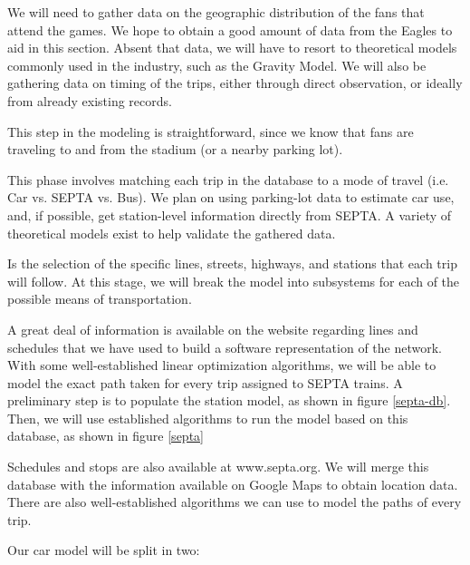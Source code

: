 \begin{description}[style=nextline]
    \item[Trip Generation] We will need to gather data on the
  geographic distribution of the fans that attend the games. We hope
  to obtain a good amount of data from the Eagles to aid in this
  section. Absent that data, we will have to resort to theoretical
  models commonly used in the industry, such as the Gravity Model. We
  will also be gathering data on timing of the trips, either through
  direct observation, or ideally from already existing records.
    \item[Trip Distribution] This step in the modeling is
  straightforward, since we know that fans are traveling to and from
  the stadium (or a nearby parking lot).
    \item[Mode Choice] This phase involves matching each trip in the
  database to a mode of travel (i.e. Car vs. SEPTA vs. Bus). We plan
  on using parking-lot data to estimate car use, and, if possible, get
  station-level information directly from SEPTA. A variety of
  theoretical models exist to help validate the gathered data.
    \item[Trip Assignment] Is the selection of the specific lines,
  streets, highways, and stations that each trip will follow. At this
  stage, we will break the model into subsystems for each of the
  possible means of transportation.
    \begin{description}[style=nextline]
        \item[Trains] A great deal of information is available on the
      website regarding lines and schedules that we have used to build
      a software representation of the network. With some
      well-established linear optimization algorithms, we will be able
      to model the exact path taken for every trip assigned to SEPTA
      trains. A preliminary step is to populate the station model, as
      shown in figure \ref{septa-db}. Then, we will use established
      algorithms to run the model based on this database, as shown in
      figure \ref{septa}
        \item[Buses] Schedules and stops are also available at
      www.septa.org. We will merge this database with the
      information available on Google Maps to obtain location data.
      There are also well-established algorithms we can use to model
      the paths of every trip.
        \item[Cars] Our car model will be split in two: \label{cars}
      \begin{itemize}

\end{itemize}
\end{description}
\end{description}
